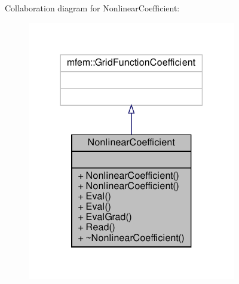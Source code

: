 Collaboration diagram for Nonlinear\+Coefficient\+:\nopagebreak
\begin{figure}[H]
\begin{center}
\leavevmode
\includegraphics[width=258pt]{classNonlinearCoefficient__coll__graph}
\end{center}
\end{figure}
